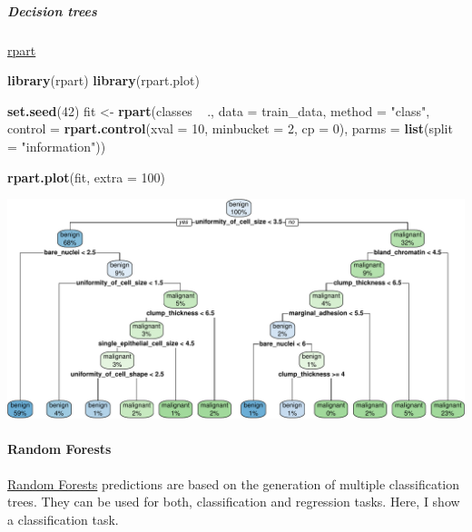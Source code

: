 \documentclass[]{article}
\newenvironment{Shaded}{\begin{snugshade}}{\end{snugshade}}
\newcommand{\KeywordTok}[1]{\textcolor[rgb]{0.13,0.29,0.53}{\textbf{{#1}}}}
\newcommand{\DataTypeTok}[1]{\textcolor[rgb]{0.13,0.29,0.53}{{#1}}}
\newcommand{\DecValTok}[1]{\textcolor[rgb]{0.00,0.00,0.81}{{#1}}}
\newcommand{\StringTok}[1]{\textcolor[rgb]{0.31,0.60,0.02}{{#1}}}
\newcommand{\NormalTok}[1]{{#1}}
\let\oldparagraph\paragraph
\renewcommand{\paragraph}[1]{\oldparagraph{#1}\mbox{}}
\let\oldsubparagraph\subparagraph
\renewcommand{\subparagraph}[1]{\oldsubparagraph{#1}\mbox{}}
\begin{document}
\subparagraph{Decision trees}\label{decision-trees}

\href{https://cran.r-project.org/web/packages/rpart/rpart.pdf}{rpart}

\begin{Shaded}
\begin{Highlighting}[]
\KeywordTok{library}\NormalTok{(rpart)}
\KeywordTok{library}\NormalTok{(rpart.plot)}

\KeywordTok{set.seed}\NormalTok{(}\DecValTok{42}\NormalTok{)}
\NormalTok{fit <-}\StringTok{ }\KeywordTok{rpart}\NormalTok{(classes ~}\StringTok{ }\NormalTok{.,}
            \DataTypeTok{data =} \NormalTok{train_data,}
            \DataTypeTok{method =} \StringTok{"class"}\NormalTok{,}
            \DataTypeTok{control =} \KeywordTok{rpart.control}\NormalTok{(}\DataTypeTok{xval =} \DecValTok{10}\NormalTok{, }
                                    \DataTypeTok{minbucket =} \DecValTok{2}\NormalTok{, }
                                    \DataTypeTok{cp =} \DecValTok{0}\NormalTok{), }
             \DataTypeTok{parms =} \KeywordTok{list}\NormalTok{(}\DataTypeTok{split =} \StringTok{"information"}\NormalTok{))}

\KeywordTok{rpart.plot}\NormalTok{(fit, }\DataTypeTok{extra =} \DecValTok{100}\NormalTok{)}
\end{Highlighting}
\end{Shaded}

\begin{center}\includegraphics{webinar_code_files/figure-latex/decision_tree-1} \end{center}

\paragraph{Random Forests}\label{random-forests}

\href{https://www.stat.berkeley.edu/~breiman/RandomForests/cc_home.htm}{Random
Forests} predictions are based on the generation of multiple
classification trees. They can be used for both, classification and
regression tasks. Here, I show a classification task.
\end{document}
